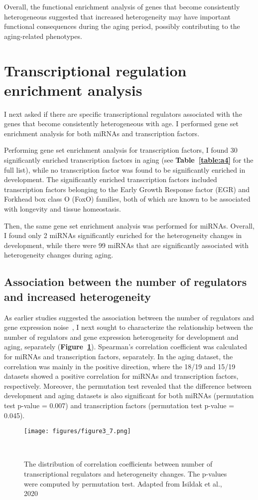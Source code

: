 Overall, the functional enrichment analysis of genes that become consistently heterogeneous suggested that 
increased heterogeneity may have important functional consequences during the aging period, possibly contributing to the aging-related phenotypes.

\section{Transcriptional regulation enrichment analysis}
I next asked if there are specific transcriptional regulators associated with the genes that become consistently heterogeneous with age.
I performed gene set enrichment analysis for both miRNAs and transcription factors.

Performing gene set enrichment analysis for transcription factors, 
I found 30 significantly enriched transcription factors in aging (see \textbf{Table~\ref{table:a4}} for the full list),
while no transcription factor was found to be significantly enriched in development. 
The significantly enriched transcription factors included transcription factors belonging to the Early Growth Response factor (EGR) and Forkhead box class O (FoxO) families,
both of which are known to be associated with longevity and tissue homeostasis. 

Then, the same gene set enrichment analysis was performed for miRNAs. 
Overall, I found only 2 miRNAs significantly enriched for the heterogeneity changes in development, 
while there were 99 miRNAs that are significantly associated with heterogeneity changes during aging.

\subsection{Association between the number of regulators and increased heterogeneity}
As earlier studies suggested the association between the number of regulators and gene expression noise~\cite{Barroso2018, Sharon2014}, 
I next sought to characterize the relationship between the number of regulators and gene expression heterogeneity for development and aging, separately (\textbf{Figure~\ref{fig:fig3.7}}).
Spearman's correlation coefficient was calculated for miRNAs and transcription factors, separately.
In the aging dataset, the correlation was mainly in the positive direction, where the 18/19 and 15/19 datasets showed a positive correlation for miRNAs and transcription factors, respectively.
Moreover, the permutation test revealed that the difference between development and aging datasets is also significant 
for both miRNAs (permutation test p-value = 0.007) and transcription factors (permutation test p-value = 0.045).

\begin{figure}[h]
    \centering
    \texttt{[image: figures/figure3\_7.png]}
    \caption{The distribution of correlation coefficients between number of transcriptional regulators and heterogeneity changes. 
    The p-values were computed by permutation test.
    Adapted from Isildak et al., 2020
    }~\label{fig:fig3.7}
\end{figure}